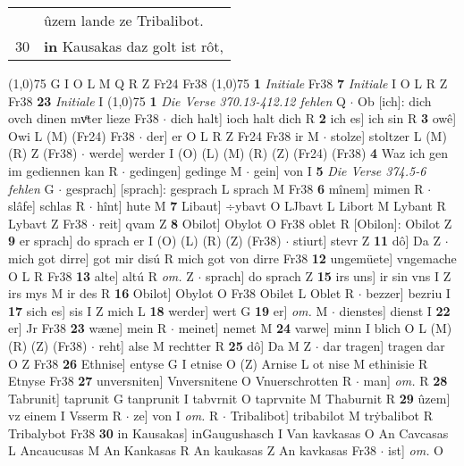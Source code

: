 \documentclass[8pt,a4paper,notitlepage]{article}
\begin{document}
\begin{table}[ht]
\begin{minipage}[t]{0.5\linewidth}
\begin{tabular}{rl}
 & ûzem lande ze Tribalibot.\\ 
30 & \textbf{in} Kausakas daz golt ist rôt,\\ 
\end{tabular}
\scriptsize
\line(1,0){75} \newline
G I O L M Q R Z Fr24 Fr38 \newline
\line(1,0){75} \newline
\textbf{1} \textit{Initiale} Fr38  \textbf{7} \textit{Initiale} I O L R Z Fr38  \textbf{23} \textit{Initiale} I  \newline
\line(1,0){75} \newline
\textbf{1} \textit{Die Verse 370.13-412.12 fehlen} Q   $\cdot$ Ob [ich]: dich ovch dinen mvͦter lieze Fr38  $\cdot$ dich halt] ioch halt dich R \textbf{2} ich es] ich sin R \textbf{3} owê] Owi L (M) (Fr24) Fr38  $\cdot$ der] er O L R Z Fr24 Fr38 ir M  $\cdot$ stolze] stoltzer L (M) (R) Z (Fr38)  $\cdot$ werde] werder I (O) (L) (M) (R) (Z) (Fr24) (Fr38) \textbf{4} Waz ich gen im gediennen kan R  $\cdot$ gedingen] gedinge M  $\cdot$ gein] von I \textbf{5} \textit{Die Verse 374.5-6 fehlen} G   $\cdot$ gesprach] [sprach]: gesprach L sprach M Fr38 \textbf{6} mînem] mimen R  $\cdot$ slâfe] schlas R  $\cdot$ hînt] hute M \textbf{7} Libaut] ÷ybavt O LJbavt L Libort M Lybant R Lybavt Z Fr38  $\cdot$ reit] qvam Z \textbf{8} Obilot] Obylot O Fr38 oblet R [Obilon]: Obilot Z \textbf{9} er sprach] do sprach er I (O) (L) (R) (Z) (Fr38)  $\cdot$ stiurt] stevr Z \textbf{11} dô] Da Z  $\cdot$ mich got dirre] got mir disú R mich got von dirre Fr38 \textbf{12} ungemüete] vngemache O L R Fr38 \textbf{13} alte] altú R \textit{om.} Z  $\cdot$ sprach] do sprach Z \textbf{15} irs uns] ir sin vns I Z irs mys M ir des R \textbf{16} Obilot] Obylot O Fr38 Obilet L Oblet R  $\cdot$ bezzer] bezriu I \textbf{17} sich es] sis I Z mich L \textbf{18} werder] wert G \textbf{19} er] \textit{om.} M  $\cdot$ dienstes] dienst I \textbf{22} er] Jr Fr38 \textbf{23} wæne] mein R  $\cdot$ meinet] nemet M \textbf{24} varwe] minn I blich O L (M) (R) (Z) (Fr38)  $\cdot$ reht] alse M rechtter R \textbf{25} dô] Da M Z  $\cdot$ dar tragen] tragen dar O Z Fr38 \textbf{26} Ethnise] entyse G I etnise O (Z) Arnise L ot nise M ethinisie R Etnyse Fr38 \textbf{27} unversniten] Vnversnitene O Vnuerschrotten R  $\cdot$ man] \textit{om.} R \textbf{28} Tabrunit] taprunit G tanprunit I tabvrnit O taprvnite M Thaburnit R \textbf{29} ûzem] vz einem I Vsserm R  $\cdot$ ze] von I \textit{om.} R  $\cdot$ Tribalibot] tribabilot M trẏbalibot R Tribalybot Fr38 \textbf{30} in Kausakas] inGaugushasch I Van kavkasas O An Cavcasas L Ancaucusas M An Kankasas R An kaukasas Z An kavkasas Fr38  $\cdot$ ist] \textit{om.} O \newline

\end{minipage}
\end{table}
\end{document}
